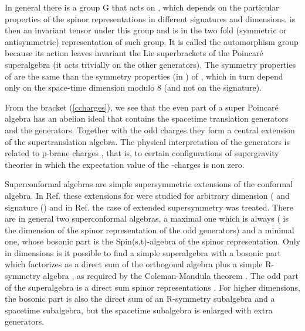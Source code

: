 \documentclass[a4paper,12pt]{article}
\begin{document}
In general there is a group G that acts on \coordHE{}, which depends on
the particular properties of the spinor representations in
different signatures and dimensions. \coordHE{} is then an invariant
tensor under this
 group and \coordHE{} is in the two fold (symmetric or
 antisymmetric) representation of such group. It is called the
 automorphism group because its action leaves invariant the Lie
 superbrackets of the Poincar\'e superalgebra (it acts trivially on the other generators).
 The
 symmetry properties  of \coordHE{} are the same than the symmetry
 properties  (in \myHighlight{$\alpha,\beta$}\coordHE{}) of \myHighlight{$\gamma^{[\mu_1\cdots
\mu_k]}_{(\alpha \beta)}$}\coordHE{}, which in turn depend only on the
space-time dimension modulo 8 (and not on the signature).


From the bracket (\ref{ccharges}), we see that  the even part of a
super Poincar\'e algebra has  an abelian ideal that contains the
spacetime translation generators and the \coordHE{} generators. Together
with the odd charges they form a central extension of the
supertranslation algebra. The physical interpretation of the \coordHE{}
generators is related to p-brane charges \cite{du,gt}, that is, to
certain configurations of supergravity theories in which the
expectation value of the \coordHE{}-charges is non zero.

Superconformal algebras are simple supersymmetric extensions of
the conformal algebra. In Ref.\cite{dflv} these extensions for
\coordHE{} were studied for arbitrary dimension (\coordHE{} and signature
(\coordHE{}) and in Ref.\cite{dfl} the case of extended
supersymmetry was treated. There are in general two superconformal
algebras, a maximal one which is always \coordHE{} (\coordHE{} is
the dimension of the spinor representation of the odd generators)
and a minimal one, whose bosonic part is the Spin(s,t)-algebra of
the spinor representation. Only in  dimensions \coordHE{} is it
possible to find a simple superalgebra with a bosonic part which
factorizes as a direct sum of the orthogonal algebra \coordHE{}
 plus a simple  R-symmetry algebra \cite{na}, as required
by the Coleman-Mandula theorem \cite{cm}. The odd part of the
superalgebra is a direct sum spinor representations  \cite{hls}.
For higher dimensions, the bosonic part is also the direct sum of
an R-symmetry subalgebra and a spacetime subalgebra, but the
spacetime subalgebra is enlarged with extra generators.
\end{document}
